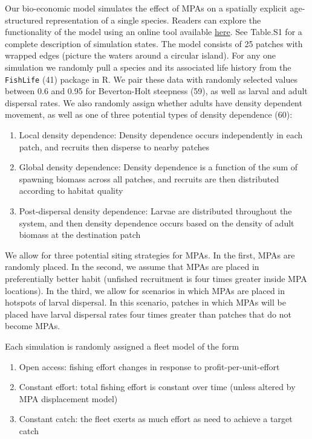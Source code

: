 \documentclass[9pt,twocolumn,twoside,lineno]{pnas-new}
\begin{document}
Our bio-economic model simulates the effect of MPAs on a spatially
explicit age-structured representation of a single species. Readers can
explore the functionality of the model using an online tool available
\href{https://danovando.shinyapps.io/simmpa/}{here}. See Table.S1 for a
complete description of simulation states. The model consists of 25
patches with wrapped edges (picture the waters around a circular
island). For any one simulation we randomly pull a species and its
associated life history from the \texttt{FishLife} (41) package in R. We
pair these data with randomly selected values between 0.6 and 0.95 for
Beverton-Holt steepness (59), as well as larval and adult dispersal
rates. We also randomly assign whether adults have density dependent
movement, as well as one of three potential types of density dependence
(60):

\begin{enumerate}
\def\labelenumi{\arabic{enumi}.}
\item
  Local density dependence: Density dependence occurs independently in
  each patch, and recruits then disperse to nearby patches
\item
  Global density dependence: Density dependence is a function of the sum
  of spawning biomass across all patches, and recruits are then
  distributed according to habitat quality
\item
  Post-dispersal density dependence: Larvae are distributed throughout
  the system, and then density dependence occurs based on the density of
  adult biomass at the destination patch
\end{enumerate}

We allow for three potential siting strategies for MPAs. In the first,
MPAs are randomly placed. In the second, we assume that MPAs are placed
in preferentially better habit (unfished recruitment is four times
greater inside MPA locations). In the third, we allow for scenarios in
which MPAs are placed in hotspots of larval dispersal. In this scenario,
patches in which MPAs will be placed have larval dispersal rates four
times greater than patches that do not become MPAs.

Each simulation is randomly assigned a fleet model of the form

\begin{enumerate}
\def\labelenumi{\arabic{enumi}.}
\item
  Open access: fishing effort changes in response to
  profit-per-unit-effort
\item
  Constant effort: total fishing effort is constant over time (unless
  altered by MPA displacement model)
\item
  Constant catch: the fleet exerts as much effort as need to achieve a
  target catch
\end{enumerate}
\end{document}
